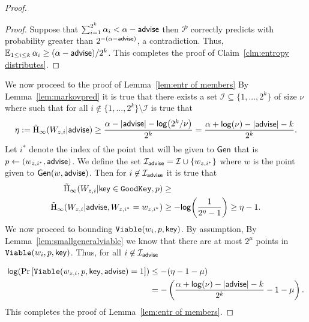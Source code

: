 \begin{proof}
\begin{proof}
\noindent
Suppose that $\sum_{i=1}^{2^k} \alpha_i < \alpha-{\mathsf{advise}}$ then $\mathcal{P}$ correctly predicts with probability greater than $2^{-(\alpha-{\mathsf{advise}})}$, a contradiction.  Thus, $\operatorname*{\mathbb{E}}_{1\le i\le k} \alpha_i \ge (\alpha-{\mathsf{advise}})/2^k$. 
This completes the proof of Claim~\ref{clm:entropy distributes}.
\end{proof}

\noindent
We now proceed to the proof of Lemma~\ref{lem:entr of members}
By Lemma~\ref{lem:markovpred} it is true that there exists a set $\mathcal{I}\subseteq \{1,...,2^k\}$ of size $\nu$ where  such that for all $i\not \in \{1,...,2^k\} \setminus\mathcal{I}$ is true that 
\[
\eta:=\tilde{\mathrm{H}}_\infty(W_{z,i} | {\mathsf{advise}}) \ge \frac{\alpha -|{\mathsf{advise}}| - \mathsf{log}\!\left(2^k/\nu\right)}{2^k} = \frac{\alpha +\mathsf{log}\!\left(\nu\right)-|{\mathsf{advise}}| - k}{2^k}.
\]
Let $i^*$ denote the index of the point that will be given to ${\mathsf{Gen}}$ that is $p\leftarrow (w_{z,i^*}, {\mathsf{advise}})$.  We define the set $\mathcal{I}_{\mathsf{advise}} = \mathcal{I} \cup \{w_{z,i^*}\}$ where $w$ is the point given to ${\mathsf{Gen}}(w, {\mathsf{advise}})$.  
Then for $i\not\in \mathcal{I}_{{\mathsf{advise}}}$ it is true that 
\begin{align*}
\tilde{\mathrm{H}}_\infty(W_{z,i} | \mathsf{key} \in \mathtt{GoodKey}, p)&\ge \\
\tilde{\mathrm{H}}_\infty(W_{z,i} | {\mathsf{advise}}, W_{z,i^*}= w_{z,i^*}) &\ge -\mathsf{log}\!\left(\frac{1}{2^{\eta}-1}\right) \ge \eta-1.
\end{align*}
We now proceed to bounding $\mathtt{Viable}(w_i, p, \mathsf{key})$.  By assumption, By Lemma~\ref{lem:smallgeneralviable} we know that there are at most $2^\mu$ points in $\mathtt{Viable}(w_i, p, \mathsf{key})$.  Thus, for all $i\not \in\mathcal{I}_{{\mathsf{advise}}}$ 

\begin{align*}
\mathsf{log}\!\left(\Pr\left[\mathtt{Viable}(w_{z,i}, p, \mathsf{key}, {\mathsf{advise}}) = 1 \right]\right)&\le - (\eta-1 -\mu)\\
&=-\left(\frac{\alpha +\mathsf{log}\!\left(\nu\right)-|{\mathsf{advise}}| - k}{2^k}-1-\mu\right).
\end{align*}
This completes the proof of Lemma~\ref{lem:entr of members}.
\end{proof}

